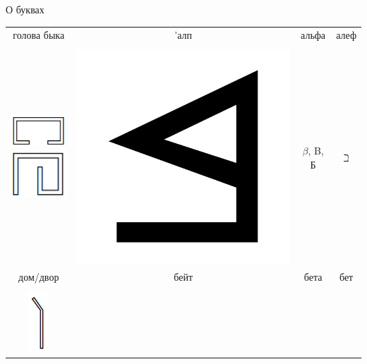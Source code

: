 \documentclass[aspectratio=169]{beamer}
\begin{document}
\begin{frame}[fragile]{О буквах}
\begin{center}
\begin{tabular}{c|c|c|c}
 голова быка &  'алп &  альфа &  алеф \\ &&& \\
\includegraphics[scale=0.25]{pics/lection-14-house}
    \includegraphics[scale=0.25]{pics/lection-14-courtyard} & 
    \includegraphics[scale=0.01]{pics/lection-14-ph-beth} & \Large $\beta$, B, Б & \Large $\beth$\\
дом/двор & бейт & бета & бет\\&&&\\
\includegraphics[scale=0.25]{pics/lection-14-throwstick} & 

\end{tabular}
\end{center}
\end{frame}
\end{document}
